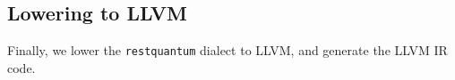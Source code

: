 \subsection{Lowering to LLVM}
Finally, we lower the \texttt{restquantum} dialect to LLVM, and generate the LLVM IR code.
